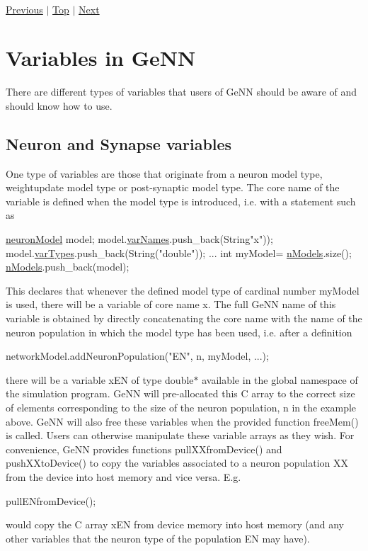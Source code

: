 ~\newline
 

 \hyperlink{sect3}{Previous} $\vert$ \hyperlink{sect_postsyn}{Top} $\vert$ \hyperlink{ListOfVariables}{Next} \hypertarget{ListOfVariables}{}\section{Variables in Ge\+N\+N}\label{ListOfVariables}
There are different types of variables that users of Ge\+N\+N should be aware of and should know how to use.\hypertarget{ListOfVariables_modelVars}{}\subsection{Neuron and Synapse variables}\label{ListOfVariables_modelVars}
One type of variables are those that originate from a neuron model type, weightupdate model type or post-\/synaptic model type. The core name of the variable is defined when the model type is introduced, i.\+e. with a statement such as 
\begin{DoxyCode}
\hyperlink{structneuronModel}{neuronModel} model;
model.\hyperlink{structneuronModel_a9a9156ffb643572fd67f6e585ef79ad0}{varNames}.push\_back(String\textcolor{stringliteral}{"x"}));
model.\hyperlink{structneuronModel_a86788cb29131da0a26ce79693a076352}{varTypes}.push\_back(String(\textcolor{stringliteral}{"double"}));
...
int myModel= \hyperlink{utils_8h_a2bd39d11c2cd6cec9bf9b81c183b6cd4}{nModels}.size();
\hyperlink{utils_8h_a2bd39d11c2cd6cec9bf9b81c183b6cd4}{nModels}.push\_back(model);
\end{DoxyCode}
 This declares that whenever the defined model type of cardinal number {\ttfamily my\+Model} is used, there will be a variable of core name {\ttfamily x}. The full Ge\+N\+N name of this variable is obtained by directly concatenating the core name with the name of the neuron population in which the model type has been used, i.\+e. after a definition 
\begin{DoxyCode}
networkModel.addNeuronPopulation(\textcolor{stringliteral}{"EN"}, n, myModel, ...);
\end{DoxyCode}
 there will be a variable {\ttfamily x\+E\+N} of type {\ttfamily double$\ast$} available in the global namespace of the simulation program. Ge\+N\+N will pre-\/allocated this C array to the correct size of elements corresponding to the size of the neuron population, {\ttfamily n} in the example above. Ge\+N\+N will also free these variables when the provided function {\ttfamily free\+Mem()} is called. Users can otherwise manipulate these variable arrays as they wish. For convenience, Ge\+N\+N provides functions {\ttfamily pull\+X\+Xfrom\+Device()} and {\ttfamily push\+X\+Xto\+Device()} to copy the variables associated to a neuron population {\ttfamily X\+X} from the device into host memory and vice versa. E.\+g. 
\begin{DoxyCode}
pullENfromDevice();
\end{DoxyCode}
 would copy the C array x\+E\+N from device memory into host memory (and any other variables that the neuron type of the population E\+N may have).

